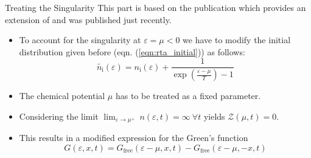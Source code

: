 \begin{frame}{Treating the Singularity}
This part is based on the publication \cite{Wolschin2020_1} which provides an extension of \cite{Wolschin2018} and was published just recently.\\[0.5em]	
\begin{itemize}
	\item To account for the singularity at $\varepsilon=\mu < 0$ we have to modify the initial distribution given before (eqn. (\ref{eqn:rta_initial})) as follows:
	\begin{equation}
		\tilde{n_{\mathrm{i}}}(\varepsilon) = n_{\mathrm{i}}(\varepsilon) + \frac{1}{\exp\left(\frac{\varepsilon-\mu}{T}\right)-1}
	\end{equation}
	\item The chemical potential $\mu$ has to be treated as a fixed parameter.
	\item Considering the limit $\lim_{\varepsilon\rightarrow\mu^{+}}\ n(\varepsilon,t) = \infty\ \forall t$ yields $\mathcal{Z}(\mu,t) = 0$.
	\item This results in a modified expression for the Green's function
	\begin{equation}
		G(\varepsilon,x,t) = G_{\mathrm{free}}(\varepsilon-\mu,x,t) - G_{\mathrm{free}}(\varepsilon-\mu,-x,t)
	\end{equation}
\end{itemize} 
\end{frame}

